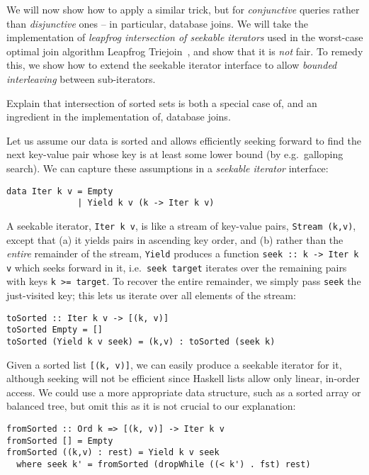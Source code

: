 \documentclass[acmsmall,screen,review,anonymous,dvipsnames,svgnames]{acmart}
\newcommand\hask[1]{\texttt{#1}}
\newcommand\ttt\texttt
\newcommand\todo[1]{{\color{Orange}#1}}
\renewcommand\todo[1]{{\color{IndianRed}#1}}
\begin{document}
We will now show how to apply a similar trick, but for \emph{conjunctive} queries rather than \emph{disjunctive} ones -- in particular, database joins.
We will take the implementation of \emph{leapfrog intersection of seekable iterators} used in the worst-case optimal join algorithm Leapfrog Triejoin~\citep{lftj}, and show that it is \emph{not} fair.
To remedy this, we show how to extend the seekable iterator interface to allow \emph{bounded interleaving} between sub-iterators.

\todo{Explain that intersection of sorted sets is both a special case of, and an ingredient in the implementation of, database joins.}

Let us assume our data is sorted and allows efficiently seeking forward to find the next key-value pair whose key is at least some lower bound (by e.g.\ galloping search).
We can capture these assumptions in a \emph{seekable iterator} interface:

\begin{verbatim}
data Iter k v = Empty
              | Yield k v (k -> Iter k v)
\end{verbatim}

\noindent
A seekable iterator, \hask{Iter k v}, is like a stream of key-value pairs, \hask{Stream (k,v)}, except that (a) it yields pairs in ascending key order, and (b) rather than the \emph{entire} remainder of the stream, \hask{Yield} produces a function \hask{seek :: k -> Iter k v} which seeks forward in it, i.e.\ \ttt{seek target} iterates over the remaining pairs with keys \ttt{k >= target}.
%
To recover the entire remainder, we simply pass \ttt{seek} the just-visited key; this lets us iterate over all elements of the stream:

\begin{verbatim}
toSorted :: Iter k v -> [(k, v)]
toSorted Empty = []
toSorted (Yield k v seek) = (k,v) : toSorted (seek k)
\end{verbatim}

\noindent
Given a sorted list \hask{[(k, v)]}, we can easily produce a seekable iterator for it, although seeking will not be efficient since Haskell lists allow only linear, in-order access.
We could use a more appropriate data structure, such as a sorted array or balanced tree, but omit this as it is not crucial to our explanation:

\begin{verbatim}
fromSorted :: Ord k => [(k, v)] -> Iter k v
fromSorted [] = Empty
fromSorted ((k,v) : rest) = Yield k v seek
  where seek k' = fromSorted (dropWhile ((< k') . fst) rest)
\end{verbatim}
\end{document}
